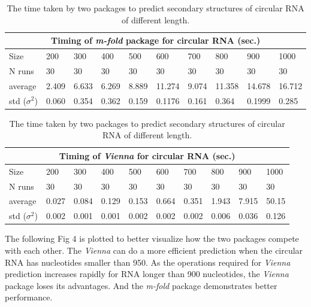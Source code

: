 \documentclass[12pt]{article}
\begin{document}
\begin{table}[h!]
\begin{center}
\begin{tabular}{ |p{1.5cm}||p{1.05cm}|p{1.05cm}|p{1.05cm}|p{1.05cm}|p{1.05cm}|p{1.05cm}|p{1.05cm}| p{1.05cm} | p{1.05cm} |}
\hline
\multicolumn{10}{|c|}{Timing of \textit{m-fold} package for circular RNA (sec.)} \\
\hline
Size& 200& 300& 400& 500& 600& 700 & 800 & 900 & 1000\\
\hline
N runs& 30 & 30& 30 & 30& 30& 30& 30& 30& 30\\
\hline
average& 2.409 & 6.633 & 6.269 & 8.889 & 11.274 & 9.074 & 11.358 & 14.678 &16.712\\
std ($\sigma^2$) & 0.060 & 0.354 & 0.362 & 0.159 & 0.1176 & 0.161 & 0.364 & 0.1999 & 0.285 \\
\hline
\end{tabular}
\begin{tabular}{ |p{1.5cm}||p{1.05cm}|p{1.05cm}|p{1.05cm}|p{1.05cm}|p{1.05cm}|p{1.05cm}|p{1.05cm}| p{1.05cm} | p{1.05cm} |}
\hline
\multicolumn{10}{|c|}{Timing of \textit{Vienna} for circular RNA (sec.)} \\
\hline
Size& 200& 300& 400& 500& 600& 700 & 800 & 900 & 1000\\
\hline
N runs& 30 & 30& 30 & 30& 30& 30& 30& 30& 30\\
\hline
average& 0.027 & 0.084 & 0.129 & 0.153 & 0.664 & 0.351 & 1.943 & 7.915 & 50.15\\
std ($\sigma^2$) & 0.002 & 0.001 & 0.001 & 0.002 & 0.002 & 0.002 & 0.006 & 0.036 & 0.126 \\
\hline
\end{tabular}
\end{center}
\caption{The time taken by two packages to predict secondary structures of circular RNA of different length.}
\end{table}

The following Fig 4 is plotted to better visualize how the two packages compete with each other. The \textit{Vienna} can do a more efficient prediction when the circular RNA has nucleotides smaller than 950. As the operations required for \textit{Vienna} prediction increases rapidly for RNA longer than 900 nucleotides, the \textit{Vienna} package loses its advantages. And the \textit{m-fold} package demonstrates better performance.
\end{document}
